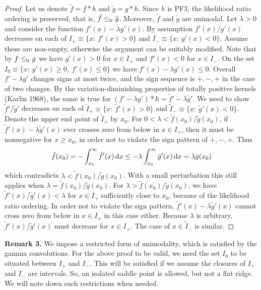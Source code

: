 \documentclass[11pt]{article}
\begin{document}
\begin{proof}
Let us denote $\tilde{f} = f*h$ and $\tilde{g} = g*h$.  Since $h$ is PF3, the likelihood ratio ordering is preserved, that is, $\tilde{f}\leq_{\rm lr} \tilde{g}$.  Moreover, $\tilde{f}$ and $\tilde{g}$ are unimodal.  Let $\lambda >0$ and consider the function $f'(x)-\lambda g'(x)$.  By assumption $f'(x)/g'(x)$ decreases on each of $I_+ \equiv \{x:\ f'(x)>0\}$ and $I_-\equiv \{x:\ g'(x)<0\}$.  Assume these are non-empty, otherwise the argument can be suitably modified.  Note that by $f\leq_{\rm lr} g$ we have $g'(x)>0$ for $x\in I_+$ and $f'(x)<0$ for $x\in I_-$.  On the set $I_0\equiv \{x:\ g'(x)\geq 0,\ f'(x)\leq 0\}$ we have $f'(x) -\lambda g'(x)\leq 0$.  Overall $f'-\lambda g'$ changes signs at most twice, and the sign sequence is $+, -, +$ in the case of two changes.  By the variation-diminishing properties of totally positive kernels (Karlin 1968), the same is true for $(f' -\lambda g')* h = \tilde{f}' -\lambda \tilde{g}'$.  We need to show $\tilde{f}'/\tilde{g}'$ decreases on each of $\tilde{I}_+\equiv \{x:\ \tilde{f}'(x)>0\}$ and $\tilde{I}_-\equiv \{x:\ \tilde{g}'(x)<0\}$.  Denote the upper end point of $\tilde{I}_+$ by $x_0$.  For $0<\lambda < \tilde{f}(x_0)/\tilde{g}(x_0)$, if $\tilde{f}'(x)-\lambda \tilde{g}'(x)$ ever crosses zero from below in $x\in I_+$, then it must be nonnegative for $x\geq x_0$, in order not to violate the sign pattern of $+, -, +$.
Thus 
$$\tilde{f}(x_0) = -\int_{x_0}^\infty \tilde{f}'(x)\, {\rm d}x \leq -\lambda \int_{x_0}^\infty \tilde{g}'(x)\, {\rm d}x = \lambda \tilde{g}(x_0)$$
which contradicts $\lambda < \tilde{f}(x_0)/\tilde{g}(x_0)$.  With a small perturbation this still applies when $\lambda = \tilde{f}(x_0)/\tilde{g}(x_0)$.  For $\lambda > \tilde{f}(x_0)/\tilde{g}(x_0)$, we have $\tilde{f}'(x)/ \tilde{g}'(x) < \lambda $ for $x\in I_+$ sufficiently close to $x_0$, because of the likelihood ratio ordering.  In order not to violate the sign pattern, $\tilde{f}'(x)-\lambda \tilde{g}'(x)$ cannot cross zero from below in $x\in I_+$ in this case either.  Because $\lambda$ is arbitrary, $\tilde{f}'(x)/\tilde{g}'(x)$ must decrease for $x\in I_+$.  The case of $x\in \tilde{I}_-$ is similar. 
\end{proof}

{\bf Remark 3.} We impose a restricted form of unimodality, which is satisfied by the gamma convolutions.  For the above proof to be valid, we need the set $I_0$ to be situated between $I_+$ and $I_-$.  This will be satisfied if we assume the closures of $I_+$ and $I_-$ are intervals.  So, an isolated saddle point is allowed, but not a flat ridge.  We will note down such restrictions when needed.
\end{document}
